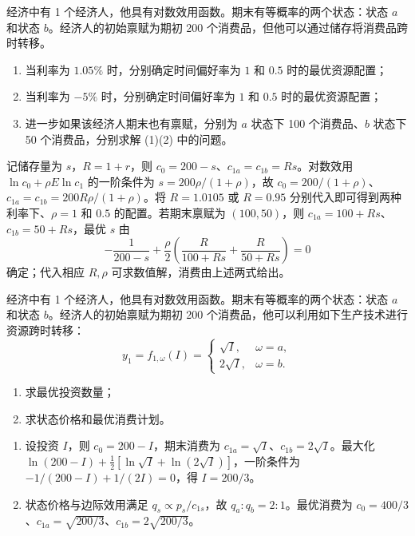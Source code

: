 \begin{problem}
 经济中有 1 个经济人，他具有对数效用函数。期末有等概率的两个状态：状态 $a$ 和状态 $b$。经济人的初始禀赋为期初 \num{200} 个消费品，但他可以通过储存将消费品跨时转移。
\begin{enumerate}[label=(\alph*)]
    \item 当利率为 $1.05\%$ 时，分别确定时间偏好率为 $1$ 和 $0.5$ 时的最优资源配置；
    \item 当利率为 $-5\%$ 时，分别确定时间偏好率为 $1$ 和 $0.5$ 时的最优资源配置；
    \item 进一步如果该经济人期末也有禀赋，分别为 $a$ 状态下 \num{100} 个消费品、$b$ 状态下 \num{50} 个消费品，分别求解 (1)(2) 中的问题。
\end{enumerate}
\end{problem}
\begin{solution}
记储存量为 $s$，$R=1+r$，则 $c_0=200-s$、$c_{1a}=c_{1b}=Rs$。对数效用 $\ln c_0+\rho E\ln c_1$ 的一阶条件为 $s=200\rho/(1+\rho)$，故 $c_0=200/(1+\rho)$、$c_{1a}=c_{1b}=200R\rho/(1+\rho)$。将 $R=1.0105$ 或 $R=0.95$ 分别代入即可得到两种利率下、$\rho=1$ 和 $0.5$ 的配置。若期末禀赋为 $(100,50)$，则 $c_{1a}=100+Rs$、$c_{1b}=50+Rs$，最优 $s$ 由
\[
-\frac1{200-s}+\frac\rho2\left(\frac R{100+Rs}+\frac R{50+Rs}\right)=0
\]
确定；代入相应 $R,\rho$ 可求数值解，消费由上述两式给出。
\end{solution}
\begin{problem}
 经济中有 1 个经济人，他具有对数效用函数。期末有等概率的两个状态：状态 $a$ 和状态 $b$。经济人的初始禀赋为期初 \num{200} 个消费品，他可以利用如下生产技术进行资源跨时转移：
\[
    y_1=f_{1,\omega}(I)=
    \begin{cases}
        \sqrt{I}, & \omega=a,\\
        2\sqrt{I}, & \omega=b.
    \end{cases}
\]
\begin{enumerate}[label=(\alph*)]
    \item 求最优投资数量；
    \item 求状态价格和最优消费计划。
\end{enumerate}
\end{problem}
\begin{solution}
\begin{enumerate}[label=(\alph*)]
\item 设投资 $I$，则 $c_0=200-I$，期末消费为 $c_{1a}=\sqrt I$、$c_{1b}=2\sqrt I$。最大化 $\ln(200-I)+\frac12[\ln\sqrt I+\ln(2\sqrt I)]$，一阶条件为 $-1/(200-I)+1/(2I)=0$，得 $I=200/3$。
\item 状态价格与边际效用满足 $q_s\propto p_s/c_{1s}$，故 $q_a:q_b=2:1$。最优消费为 $c_0=400/3$、$c_{1a}=\sqrt{200/3}$、$c_{1b}=2\sqrt{200/3}$。
\end{enumerate}
\end{solution}
